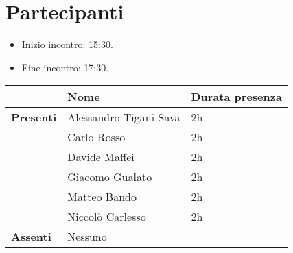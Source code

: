 \section{Partecipanti}

\begin{itemize}
    \item Inizio incontro: 15:30.
    \item Fine incontro: 17:30.
\end{itemize}


\begin{center}
{\renewcommand{\arraystretch}{1.5}
\begin{tabular}{lll}
	                    & \textbf{Nome}  			& \textbf{Durata presenza} \\
	\hline
	\textbf{Presenti}   & Alessandro Tigani Sava	& 2h	\\  
						& Carlo Rosso  				& 2h	\\
						& Davide Maffei          	& 2h	\\ 
						& Giacomo Gualato 			& 2h 	\\
						& Matteo Bando           	& 2h	\\   
						& Niccolò Carlesso 			& 2h 	\\  
	\hline
	\textbf{Assenti}	& Nessuno            		&      	\\
\end{tabular}	
}
\end{center}